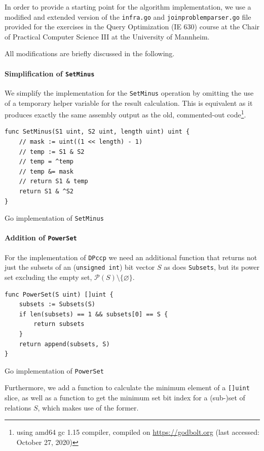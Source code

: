 In order to provide a starting point for the algorithm implementation, we use a modified and extended version of the \texttt{infra.go} and \texttt{joinproblemparser.go} file provided for the exercises in the Query Optimization (IE 630) course at the Chair of Practical Computer Science III at the University of Mannheim.

All modifications are briefly discussed in the following.
\paragraph{Simplification of \texttt{SetMinus}}
We simplify the implementation for the \texttt{SetMinus} operation by omitting the use of a temporary helper variable for the result calculation. This is equivalent as it produces exactly the same assembly output as the old, commented-out code\footnote{using amd64 gc 1.15 compiler, compiled on \url{https://godbolt.org} (last accessed: October 27, 2020)}.

\begin{algorithm}
\begin{verbatim}
func SetMinus(S1 uint, S2 uint, length uint) uint {
    // mask := uint((1 << length) - 1)
    // temp := S1 & S2
    // temp = ^temp
    // temp &= mask
    // return S1 & temp
    return S1 & ^S2
}
\end{verbatim}
\caption{Go implementation of \texttt{SetMinus}}
\label{alg:implementation-setminus}
\end{algorithm}

\paragraph{Addition of \texttt{PowerSet}}
For the implementation of \texttt{DPccp} we need an additional function that returns not just the subsets of an (\texttt{unsigned int}) bit vector $S$ as does \texttt{Subsets}, but its power set excluding the empty set, $\mathcal P(S)\setminus\{\varnothing\}$.

\begin{algorithm}
\begin{verbatim}
func PowerSet(S uint) []uint {
    subsets := Subsets(S)
    if len(subsets) == 1 && subsets[0] == S {
        return subsets
    }
    return append(subsets, S)
}
\end{verbatim}
\caption{Go implementation of \texttt{PowerSet}}
\label{alg:implementation-powerset}
\end{algorithm}

Furthermore, we add a function to calculate the minimum element of a \texttt{[]uint} slice, as well as a function to get the minimum set bit index for a (sub-)set of relations $S$, which makes use of the former.

